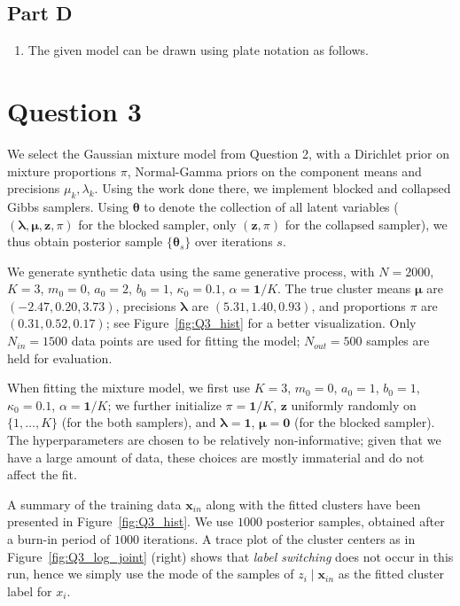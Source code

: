 \documentclass[12pt]{article}
\begin{document}
\subsection*{Part D}
\begin{enumerate}[label=(\alph*), resume]
    \item The given model can be drawn using plate notation as follows.
\end{enumerate}



\clearpage

\section*{Question 3}

We select the Gaussian mixture model from Question 2, with a Dirichlet prior on
mixture proportions $\pi$, Normal-Gamma priors on the component means and
precisions $\mu_k, \lambda_k$.
Using the work done there, we implement blocked and collapsed Gibbs samplers.
Using $\bm{\theta}$ to denote the collection of all latent variables
($(\bm{\lambda}, \bm{\mu}, \bm{z}, \pi)$ for the blocked sampler, only
$(\bm{z}, \pi)$ for the collapsed sampler), we thus obtain posterior sample
$\{\bm{\theta}_s\}$ over iterations $s$.

We generate synthetic data using the same generative process, with $N = 2000$,
$K = 3$, $m_0 = 0$, $a_0 = 2$, $b_0 = 1$, $\kappa_0 = 0.1$, $\alpha =
\bm{1}/K$.
The true cluster means $\bm{\mu}$ are $(-2.47, 0.20, 3.73)$, precisions
$\bm{\lambda}$ are $(5.31, 1.40, 0.93)$, and proportions $\pi$ are $(0.31,
0.52, 0.17)$; see Figure~\ref{fig:Q3_hist} for a better visualization.
Only $N_{in} = 1500$ data points are used for fitting the model; $N_{out} =
500$ samples are held for evaluation.

When fitting the mixture model, we first use $K = 3$, $m_0 = 0$, $a_0 = 1$,
$b_0 = 1$, $\kappa_0 = 0.1$, $\alpha = \bm{1}/K$; we further initialize $\pi =
\bm{1}/K$, $\bm{z}$ uniformly randomly on $\{1, \dots, K\}$ (for the both
samplers), and $\bm{\lambda} = \bm{1}$, $\bm{\mu} = \bm{0}$ (for the blocked
sampler).
The hyperparameters are chosen to be relatively non-informative; given that we
have a large amount of data, these choices are mostly immaterial and do not
affect the fit.

A summary of the training data $\bm{x}_{in}$ along with the fitted clusters
have been presented in Figure~\ref{fig:Q3_hist}.
We use $1000$ posterior samples, obtained after a burn-in period of $1000$
iterations.
A trace plot of the cluster centers as in Figure~\ref{fig:Q3_log_joint} (right)
shows that \emph{label switching} does not occur in this run, hence we simply
use the mode of the samples of $z_i \mid \bm{x}_{in}$ as the fitted cluster
label for $x_i$.
\end{document}
